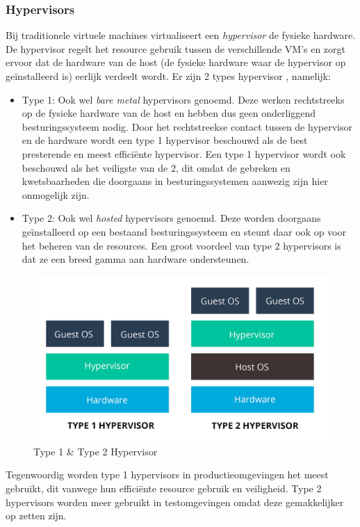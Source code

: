 \subsubsection{Hypervisors}
Bij traditionele virtuele machines virtualiseert een \textit{hypervisor} de fysieke hardware. De hypervisor regelt het resource gebruik tussen de verschillende VM's en zorgt ervoor dat de hardware van de host (de fysieke hardware waar de hypervisor op geïnstalleerd is) eerlijk verdeelt wordt. Er zijn 2 types hypervisor \autocite{VMWare2021}, namelijk:
\begin{itemize}
    \item Type 1: Ook wel \textit{bare metal} hypervisors genoemd. Deze werken rechtstreeks op de fysieke hardware van de host en hebben dus geen onderliggend besturingssysteem nodig. Door het rechtstreekse contact tussen de hypervisor en de hardware wordt een type 1 hypervisor beschouwd als de best presterende en meest efficiënte hypervisor. Een type 1 hypervisor wordt ook beschouwd als het veiligste van de 2, dit omdat de gebreken en kwetsbaarheden die doorgaans in besturingssystemen aanwezig zijn hier onmogelijk zijn.
    \item Type 2: Ook wel \textit{hosted} hypervisors genoemd. Deze worden doorgaans geïnstalleerd op een bestaand besturingssysteem en steunt daar ook op voor het beheren van de resources. Een groot voordeel van type 2 hypervisors is dat ze een breed gamma aan hardware ondersteunen.
\end{itemize}
\begin{figure}[ht]
    \centering
    \includegraphics[width=\linewidth]{img/Hypervisor.png}
    \caption{Type 1 \& Type 2 Hypervisor \autocite{VMWare2021}}
    \label{fig:hypers}
\end{figure}

Tegenwoordig worden type 1 hypervisors in productieomgevingen het meest gebruikt, dit vanwege hun efficiënte resource gebruik en veiligheid. Type 2 hypervisors worden meer gebruikt in testomgevingen omdat deze gemakkelijker op zetten zijn.

